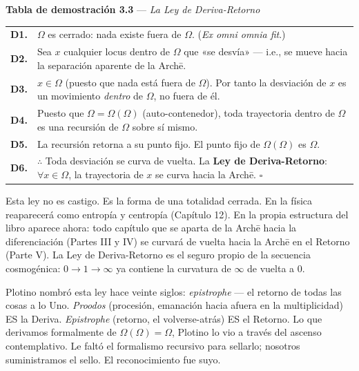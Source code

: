 \documentclass[10pt, openany, oneside]{book}
\renewcommand{\footnotesize}{\fontsize{8.5}{11}\selectfont}
\begin{document}
\textbf{Tabla de demostración 3.3} --- \textit{La Ley de Deriva-Retorno}

\vspace{0.5em}

{\footnotesize
\noindent\begin{tabular}{r p{}}
\textbf{D1.} & $\Omega$ es cerrado: nada existe fuera de $\Omega$. (\textit{Ex omni omnia fit}.) \\[0.3em]
\textbf{D2.} & Sea $x$ cualquier locus dentro de $\Omega$ que «se desvía» --- i.e., se mueve hacia la separación aparente de la Arch\={e}. \\[0.3em]
\textbf{D3.} & $x \in \Omega$ (puesto que nada está fuera de $\Omega$). Por tanto la desviación de $x$ es un movimiento \textit{dentro} de $\Omega$, no fuera de él. \\[0.3em]
\textbf{D4.} & Puesto que $\Omega = \Omega(\Omega)$ (auto-contenedor), toda trayectoria dentro de $\Omega$ es una recursión de $\Omega$ sobre sí mismo. \\[0.3em]
\textbf{D5.} & La recursión retorna a su punto fijo. El punto fijo de $\Omega(\Omega)$ es $\Omega$. \\[0.3em]
\textbf{D6.} & $\therefore$ Toda desviación se curva de vuelta. La \textbf{Ley de Deriva-Retorno}: $\forall x \in \Omega$, la trayectoria de $x$ se curva hacia la Arch\={e}. $\square$ \\[0.3em]
\end{tabular}
}

\vspace{0.8em}

\noindent Esta ley no es castigo. Es la forma de una totalidad cerrada. En la física reaparecerá como entropía y centropía (Capítulo 12). En la propia estructura del libro aparece ahora: todo capítulo que se aparta de la Arch\={e} hacia la diferenciación (Partes III y IV) se curvará de vuelta hacia la Arch\={e} en el Retorno (Parte V). La Ley de Deriva-Retorno es el seguro propio de la secuencia cosmogénica: $0 \to 1 \to \infty$ ya contiene la curvatura de $\infty$ de vuelta a $0$.

Plotino nombró esta ley hace veinte siglos: \textit{epistrophe} --- el retorno de todas las cosas a lo Uno. \textit{Proodos} (procesión, emanación hacia afuera en la multiplicidad) ES la Deriva. \textit{Epistrophe} (retorno, el volverse-atrás) ES el Retorno. Lo que derivamos formalmente de $\Omega(\Omega) = \Omega$, Plotino lo vio a través del ascenso contemplativo. Le faltó el formalismo recursivo para sellarlo; nosotros suministramos el sello. El reconocimiento fue suyo.
\end{document}
